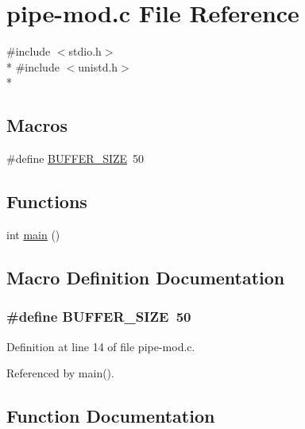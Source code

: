 \hypertarget{pipe-mod_8c}{}\section{pipe-\/mod.c File Reference}
\label{pipe-mod_8c}
{\ttfamily \#include $<$stdio.\+h$>$}\\*
{\ttfamily \#include $<$unistd.\+h$>$}\\*
\subsection*{Macros}
\begin{DoxyCompactItemize}
\item 
\#define \hyperlink{pipe-mod_8c_a6b20d41d6252e9871430c242cb1a56e7}{B\+U\+F\+F\+E\+R\+\_\+\+S\+I\+ZE}~50
\end{DoxyCompactItemize}
\subsection*{Functions}
\begin{DoxyCompactItemize}
\item 
int \hyperlink{pipe-mod_8c_ae66f6b31b5ad750f1fe042a706a4e3d4}{main} ()
\end{DoxyCompactItemize}


\subsection{Macro Definition Documentation}
\subsubsection[{\texorpdfstring{B\+U\+F\+F\+E\+R\+\_\+\+S\+I\+ZE}{BUFFER_SIZE}}]{\setlength{\rightskip}{0pt plus 5cm}\#define B\+U\+F\+F\+E\+R\+\_\+\+S\+I\+ZE~50}\hypertarget{pipe-mod_8c_a6b20d41d6252e9871430c242cb1a56e7}{}\label{pipe-mod_8c_a6b20d41d6252e9871430c242cb1a56e7}


Definition at line 14 of file pipe-\/mod.\+c.



Referenced by main().



\subsection{Function Documentation}

